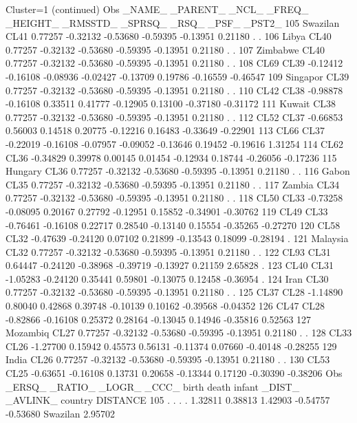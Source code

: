 \documentclass{article}
\begin{document}
\begin{Woutput}
Cluster=1
(continued)
Obs _NAME_   _PARENT_   _NCL_   _FREQ_  _HEIGHT_ _RMSSTD_  _SPRSQ_   _RSQ_    _PSF_   _PST2_
105 Swazilan   CL41    0.77257 -0.32132 -0.53680 -0.59395 -0.13951  0.21180   .        .
106 Libya      CL40    0.77257 -0.32132 -0.53680 -0.59395 -0.13951  0.21180   .        .
107 Zimbabwe   CL40    0.77257 -0.32132 -0.53680 -0.59395 -0.13951  0.21180   .        .
108 CL69       CL39   -0.12412 -0.16108 -0.08936 -0.02427 -0.13709  0.19786 -0.16559 -0.46547
109 Singapor   CL39    0.77257 -0.32132 -0.53680 -0.59395 -0.13951  0.21180   .        .
110 CL42       CL38   -0.98878 -0.16108  0.33511  0.41777 -0.12905  0.13100 -0.37180 -0.31172
111 Kuwait     CL38    0.77257 -0.32132 -0.53680 -0.59395 -0.13951  0.21180   .        .
112 CL52       CL37   -0.66853  0.56003  0.14518  0.20775 -0.12216  0.16483 -0.33649 -0.22901
113 CL66       CL37   -0.22019 -0.16108 -0.07957 -0.09052 -0.13646  0.19452 -0.19616  1.31254
114 CL62       CL36   -0.34829  0.39978  0.00145  0.01454 -0.12934  0.18744 -0.26056 -0.17236
115 Hungary    CL36    0.77257 -0.32132 -0.53680 -0.59395 -0.13951  0.21180   .        .
116 Gabon      CL35    0.77257 -0.32132 -0.53680 -0.59395 -0.13951  0.21180   .        .
117 Zambia     CL34    0.77257 -0.32132 -0.53680 -0.59395 -0.13951  0.21180   .        .
118 CL50       CL33   -0.73258 -0.08095  0.20167  0.27792 -0.12951  0.15852 -0.34901 -0.30762
119 CL49       CL33   -0.76461 -0.16108  0.22717  0.28540 -0.13140  0.15554 -0.35265 -0.27270
120 CL58       CL32   -0.47639 -0.24120  0.07102  0.21899 -0.13543  0.18099 -0.28194   .
121 Malaysia   CL32    0.77257 -0.32132 -0.53680 -0.59395 -0.13951  0.21180   .        .
122 CL93       CL31    0.64447 -0.24120 -0.38968 -0.39719 -0.13927  0.21159  2.65828   .
123 CL40       CL31   -1.05283 -0.24120  0.35441  0.59801 -0.13075  0.12458 -0.36954   .
124 Iran       CL30    0.77257 -0.32132 -0.53680 -0.59395 -0.13951  0.21180   .        .
125 CL37       CL28   -1.14890  0.80040  0.42868  0.39748 -0.10139  0.10162 -0.39568 -0.04352
126 CL47       CL28   -0.82866 -0.16108  0.25372  0.28164 -0.13045  0.14946 -0.35816  0.52563
127 Mozambiq   CL27    0.77257 -0.32132 -0.53680 -0.59395 -0.13951  0.21180   .        .
128 CL33       CL26   -1.27700  0.15942  0.45573  0.56131 -0.11374  0.07660 -0.40148 -0.28255
129 India      CL26    0.77257 -0.32132 -0.53680 -0.59395 -0.13951  0.21180   .        .
130 CL53       CL25   -0.63651 -0.16108  0.13731  0.20658 -0.13344  0.17120 -0.30390 -0.38206
Obs  _ERSQ_ _RATIO_  _LOGR_  _CCC_    birth    death   infant   _DIST_  _AVLINK_ country  DISTANCE
105  .       .       .       .       1.32811  0.38813  1.42903 -0.54757 -0.53680 Swazilan  2.95702

\end{Woutput}
\end{document}
